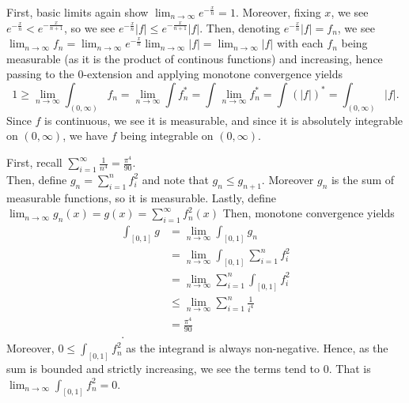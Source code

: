 \documentclass[a4paper]{article}
\begin{document}
\newpage
\begin{problem}[34]
	First, basic limits again show \(\lim_{n \to \infty}e^{-\frac{x}{n}} = 1\). Moreover, fixing \(x\), we see \(e^{-\frac{x}{n}} < e^{-\frac{x}{n+1}}\), so we see \(e^{-\frac{x}{n}}\left| f \right| \le e^{-\frac{x}{n+1}}\left| f \right| \). Then, denoting \(e^{-\frac{x}{n}}\left| f \right| = f_{n}\), we see \(\lim_{n \to \infty}f_{n} = \lim_{n \to \infty}e^{-\frac{x}{n}} \lim_{n \to \infty}\left| f \right| = \lim_{n \to \infty}\left| f \right| \) with each \(f_{n}\) being measurable (as it is the product of continous functions) and increasing, hence passing to the \(0\)-extension and applying monotone convergence yields \[
	1 \ge \lim_{n \to \infty}\int_{\left( 0, \infty \right) } f_{n} = \lim_{n \to \infty} \int f_{n}^{*} =  \int_{ } \lim_{n \to \infty}f_{n}^{*} = \int_{} (\left| f \right|)^{*} = \int_{\left( 0, \infty \right) } \left| f \right|
	.\]
	Since \(f\) is continuous, we see it is measurable, and since it is absolutely integrable on \(\left( 0, \infty \right) \), we have \(f\) being integrable on \(\left( 0, \infty \right) \).
\end{problem}
\newpage
\begin{problem}[35]
	First, recall \(\sum_{i= 1}^{\infty} \frac{1}{n^{4} } = \frac{\pi^{4}}{90}\).\\
	Then, define \(g_{n} = \sum_{i= 1}^{n} f_{i}^2\) and note that \(g_{n} \le g_{n+1}\). Moreover \(g_{n}\) is the sum of measurable functions, so it is measurable. Lastly, define \(\lim_{n \to \infty}g_{n}\left( x \right) = g\left( x \right)  = \sum_{i= 1}^{\infty} f_{n}^2\left( x \right) \) Then, monotone convergence yields
	\begin{align*}
		\int_{\left[ 0, 1 \right] } g &= \lim_{n \to \infty} \int_{\left[ 0, 1 \right] }g_{n}\\
		&= \lim_{n \to \infty} \int_{\left[ 0, 1 \right] } \sum_{i= 1}^{n} f_{i}^2 \\
		&= \lim_{n \to \infty} \sum_{i= 1}^{n} \int_{\left[ 0, 1 \right] }f_{i}^2 \\
		&\le \lim_{n \to \infty} \sum_{i= 1}^{n} \frac{1}{i^{4}} \\
		&= \frac{\pi^{4}}{90} \\
	.\end{align*}
	Moreover, \(0 \le \int_{\left[ 0, 1 \right] }f_{n}^2\) as the integrand is always non-negative. Hence, as the sum is bounded and strictly increasing, we see the terms tend to \(0\). That is \( \lim_{n \to \infty} \int _{\left[ 0, 1 \right] }f_{n}^2 = 0\).
\end{problem}
\end{document}
